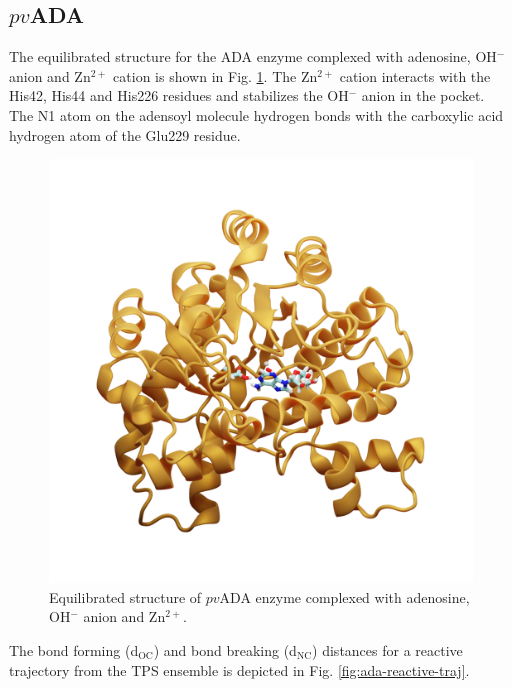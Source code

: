 \documentclass[journal=jpcbfk,manuscript=article,layout=traditional]{achemso}
\begin{document}
\subsection{$pv$ADA}
The equilibrated structure for the ADA enzyme complexed with adenosine, 
OH$^{-}$ anion and Zn$^{2+}$ cation is shown in Fig. \ref{fig:ada-equil}.
The Zn$^{2+}$ cation interacts with the His42, His44 and His226 residues
and stabilizes the OH$^{-}$ anion in the pocket. The N1 atom on the adensoyl 
molecule hydrogen bonds with the carboxylic acid hydrogen atom of the Glu229 
residue.  
\begin{figure}[ht!]
\centering
\includegraphics[scale=0.2]{./figures/ada-equil.png}
\caption{Equilibrated structure of $pv$ADA enzyme complexed with adenosine, 
OH$^{-}$ anion and Zn$^{2+}$.}
\label{fig:ada-equil}
\end{figure}
The bond forming (d$_{\text{OC}}$) and bond breaking (d$_{\text{NC}}$) distances 
for a reactive trajectory from the TPS ensemble is depicted 
in Fig. \ref{fig:ada-reactive-traj}.
\end{document}
